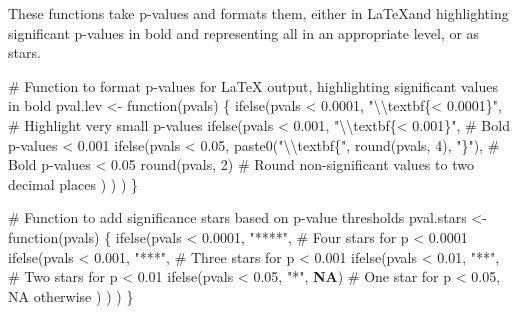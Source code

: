 \documentclass[
  bookmarksnumbered]{article}
\newenvironment{Shaded}{\begin{snugshade}}{\end{snugshade}}
\newcommand{\CommentTok}[1]{\textcolor[rgb]{0.50,0.62,0.50}{#1}}
\newcommand{\ConstantTok}[1]{\textcolor[rgb]{0.86,0.64,0.64}{\textbf{#1}}}
\newcommand{\ControlFlowTok}[1]{\textcolor[rgb]{0.94,0.87,0.69}{#1}}
\newcommand{\DecValTok}[1]{\textcolor[rgb]{0.86,0.86,0.80}{#1}}
\newcommand{\FloatTok}[1]{\textcolor[rgb]{0.75,0.75,0.82}{#1}}
\newcommand{\FunctionTok}[1]{\textcolor[rgb]{0.94,0.94,0.56}{#1}}
\newcommand{\NormalTok}[1]{\textcolor[rgb]{0.80,0.80,0.80}{#1}}
\newcommand{\OtherTok}[1]{\textcolor[rgb]{0.94,0.94,0.56}{#1}}
\newcommand{\SpecialCharTok}[1]{\textcolor[rgb]{0.86,0.64,0.64}{#1}}
\newcommand{\StringTok}[1]{\textcolor[rgb]{0.80,0.58,0.58}{#1}}
\begin{document}
These functions take p-values and formats them, either in \LaTeX and highlighting significant p-values in bold and representing all in an appropriate level, or as stars.

\begin{Shaded}
\begin{Highlighting}[]
\CommentTok{\# Function to format p{-}values for LaTeX output, highlighting significant values in bold}
\NormalTok{pval.lev }\OtherTok{\textless{}{-}} \ControlFlowTok{function}\NormalTok{(pvals) \{}
  \FunctionTok{ifelse}\NormalTok{(pvals }\SpecialCharTok{\textless{}} \FloatTok{0.0001}\NormalTok{, }\StringTok{"}\SpecialCharTok{\textbackslash{}\textbackslash{}}\StringTok{textbf\{\textless{} 0.0001\}"}\NormalTok{, }\CommentTok{\# Highlight very small p{-}values}
         \FunctionTok{ifelse}\NormalTok{(pvals }\SpecialCharTok{\textless{}} \FloatTok{0.001}\NormalTok{, }\StringTok{"}\SpecialCharTok{\textbackslash{}\textbackslash{}}\StringTok{textbf\{\textless{} 0.001\}"}\NormalTok{, }\CommentTok{\# Bold p{-}values \textless{} 0.001}
                \FunctionTok{ifelse}\NormalTok{(pvals }\SpecialCharTok{\textless{}} \FloatTok{0.05}\NormalTok{, }\FunctionTok{paste0}\NormalTok{(}\StringTok{"}\SpecialCharTok{\textbackslash{}\textbackslash{}}\StringTok{textbf\{"}\NormalTok{, }\FunctionTok{round}\NormalTok{(pvals, }\DecValTok{4}\NormalTok{), }\StringTok{"\}"}\NormalTok{), }\CommentTok{\# Bold p{-}values \textless{} 0.05}
                       \FunctionTok{round}\NormalTok{(pvals, }\DecValTok{2}\NormalTok{) }\CommentTok{\# Round non{-}significant values to two decimal places}
\NormalTok{                )}
\NormalTok{         )}
\NormalTok{  )}
\NormalTok{\}}

\CommentTok{\# Function to add significance stars based on p{-}value thresholds}
\NormalTok{pval.stars }\OtherTok{\textless{}{-}} \ControlFlowTok{function}\NormalTok{(pvals) \{}
  \FunctionTok{ifelse}\NormalTok{(pvals }\SpecialCharTok{\textless{}} \FloatTok{0.0001}\NormalTok{, }\StringTok{"****"}\NormalTok{, }\CommentTok{\# Four stars for p \textless{} 0.0001}
         \FunctionTok{ifelse}\NormalTok{(pvals }\SpecialCharTok{\textless{}} \FloatTok{0.001}\NormalTok{, }\StringTok{"***"}\NormalTok{, }\CommentTok{\# Three stars for p \textless{} 0.001}
                \FunctionTok{ifelse}\NormalTok{(pvals }\SpecialCharTok{\textless{}} \FloatTok{0.01}\NormalTok{, }\StringTok{"**"}\NormalTok{, }\CommentTok{\# Two stars for p \textless{} 0.01}
                       \FunctionTok{ifelse}\NormalTok{(pvals }\SpecialCharTok{\textless{}} \FloatTok{0.05}\NormalTok{, }\StringTok{"*"}\NormalTok{, }\ConstantTok{NA}\NormalTok{) }\CommentTok{\# One star for p \textless{} 0.05, NA otherwise}
\NormalTok{                )}
\NormalTok{         )}
\NormalTok{  )}
\NormalTok{\}}
\end{Highlighting}
\end{Shaded}
\end{document}
